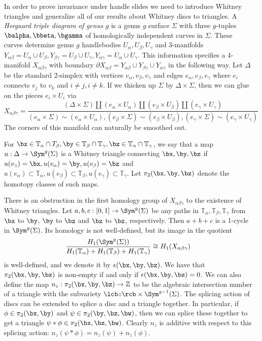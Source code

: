 In order to prove invariance under handle slides we need to introduce Whitney triangles and generalize all of our results about Whitney discs to triangles. A \emph{Heegaard triple diagram of genus $g$} is a genus $g$ surface $\Sigma$ with three $g$-tuples $\balpha,\bbeta,\bgamma$ of homologically independent curves in $\Sigma$. These curves determine genus $g$ handlebodies $U_\alpha,U_\beta,U_\gamma$ and 3-manifolds $Y_{\alpha\beta} = U_\alpha \cup U_\beta,Y_{\beta\gamma}=U_\beta \cup U_\gamma,Y_{\alpha\gamma} = U_\alpha \cup U_\gamma$. This information specifies a 4-manifold $X_{\alpha\beta\gamma}$ with boundary $\partial X_{\alpha\beta} = Y_{\alpha\beta} \cup Y_{\beta\gamma} \cup Y_{\alpha\gamma}$ in the following way. Let $\Delta$ be the standard 2-simplex with vertices $v_\alpha,v_\beta,v_\gamma$ and edges $e_\alpha,e_\beta,e_\gamma$ where $e_i$ connects $v_j$ to $v_k$ and $i \neq j,i \neq k$. If we thicken up $\Sigma$ by $\Delta \times \Sigma$, then we can glue on the pieces $e_i \times U_i$ via
\[ X_{\alpha\beta\gamma} = \frac{(\Delta \times \Sigma) \coprod (e_\alpha \times U_\alpha) \coprod (e_\beta \times U_\beta) \coprod (e_\gamma \times U_\gamma)}{(e_\alpha \times \Sigma) \sim (e_\alpha \times U_\alpha), (e_\beta \times \Sigma) \sim (e_\beta \times U_\beta), (e_\gamma \times \Sigma) \sim (e_\gamma \times U_\gamma)} \]
The corners of this manifold can naturally be smoothed out. 

For $\bx \in \mathbb T_\alpha \cap T_\beta, \by \in \mathbb T_\beta \cap \mathbb T_\gamma, \bz \in \mathbb T_\alpha \cap \mathbb T_\gamma$, we say that a map $u : \Delta \rightarrow \Sym^g(\Sigma)$ is a Whitney triangle connecting $\bx,\by,\bz$ if $u(v_\gamma)=\bx,u(v_\alpha)=\by,u(v_\beta)=\bz$ and $u(e_\alpha) \subset \mathbb T_\alpha,u(e_\beta) \subset \mathbb T_\beta, u(e_\gamma) \subset \mathbb T_\gamma$. Let $\pi_2(\bx,\by,\bz)$ denote the homotopy classes of such maps. 

There is an obstruction in the first homology group of $X_{\alpha\beta\gamma}$ to the existence of Whitney triangles. Let $a,b,c : [0,1] \rightarrow \Sym^g(\Sigma)$ be any paths in $\mathbb T_\alpha,\mathbb T_\beta,\mathbb T_\gamma$ from $\bx$ to $\by$, $\by$ to $\bz$ and $\bz$ to $\bz$, respectively. Then $a+b+c$ is a 1-cycle in $\Sym^g(\Sigma)$. Its homology is not well-defined, but its image in the quotient
\[ \frac{H_1(\Sym^g(\Sigma))}{H_1(\mathbb T_\alpha) + H_1(\mathbb T_\beta) + H_1(\mathbb T_\gamma)} \cong H_1(X_{\alpha\beta\gamma}) \]
is well-defined, and we denote it by $\epsilon(\bx,\by,\bz)$. We have that $\pi_2(\bx,\by,\bz)$ is non-empty if and only if $\epsilon(\bx,\by,\bz)=0$. We can also define the map $n_z : \pi_2(\bx,\by,\bz) \rightarrow \mathbb Z$ to be the algebraic intersection number of a triangle with the subvariety $\lcb z \rcb \times \Sym^{g-1}(\Sigma)$. The splicing action of discs can be extended to splice a disc and a triangle together. In particular, if $\phi \in \pi_2(\bx,\by)$ and $\psi \in \pi_2(\by,\bz,\bw)$, then we can splice these together to get a triangle $\psi * \phi \in \pi_2(\bx,\bz,\bw)$. Clearly $n_z$ is additive with respect to this splicing action: $n_z(\psi*\phi)=n_z(\psi)+n_z(\phi)$. 

